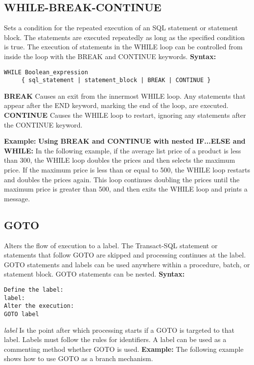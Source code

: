 \subsection{WHILE-BREAK-CONTINUE}
Sets a condition for the repeated execution of an SQL statement or statement block. The statements are executed repeatedly as long as the specified condition is true. The execution of statements in the WHILE loop can be controlled from inside the loop with the BREAK and CONTINUE keywords.\newline
\textbf{Syntax:}
\begin{verbatim}
WHILE Boolean_expression   
     { sql_statement | statement_block | BREAK | CONTINUE }   
\end{verbatim}
\textbf{BREAK}\newline
Causes an exit from the innermost WHILE loop. Any statements that appear after the END keyword, marking the end of the loop, are executed.\newline
\textbf{CONTINUE}\newline
Causes the WHILE loop to restart, ignoring any statements after the CONTINUE keyword.\newline

\textbf{Example:}\newline
\textbf{Using BREAK and CONTINUE with nested IF...ELSE and WHILE:}\newline
In the following example, if the average list price of a product is less than 300, the WHILE loop doubles the prices and then selects the maximum price. If the maximum price is less than or equal to 500, the WHILE loop restarts and doubles the prices again. This loop continues doubling the prices until the maximum price is greater than 500, and then exits the WHILE loop and prints a message.


\subsection{GOTO}
Alters the flow of execution to a label. The Transact-SQL statement or statements that follow GOTO are skipped and processing continues at the label. GOTO statements and labels can be used anywhere within a procedure, batch, or statement block. GOTO statements can be nested.\newline
\textbf{Syntax:}
\begin{verbatim}
Define the label:   
label:   
Alter the execution:  
GOTO label    
\end{verbatim}
\textit{label}\newline
Is the point after which processing starts if a GOTO is targeted to that label. Labels must follow the rules for identifiers. A label can be used as a commenting method whether GOTO is used.
\textbf{Example:}\newline
The following example shows how to use GOTO as a branch mechanism.


\clearpage
